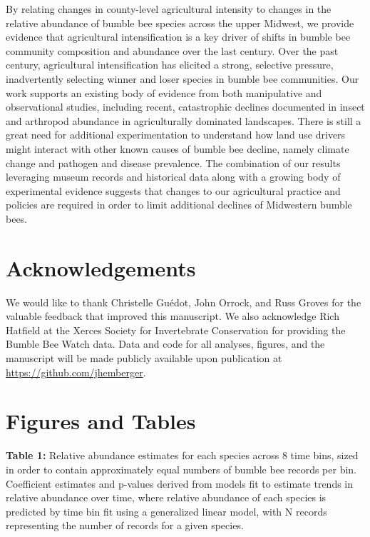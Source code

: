 \documentclass[11pt,]{article}
\begin{document}
By relating changes in county-level agricultural intensity to changes in
the relative abundance of bumble bee species across the upper Midwest,
we provide evidence that agricultural intensification is a key driver of
shifts in bumble bee community composition and abundance over the last
century. Over the past century, agricultural intensification has
elicited a strong, selective pressure, inadvertently selecting winner
and loser species in bumble bee communities. Our work supports an
existing body of evidence from both manipulative and observational
studies, including recent, catastrophic declines documented in insect
and arthropod abundance in agriculturally dominated landscapes. There is
still a great need for additional experimentation to understand how land
use drivers might interact with other known causes of bumble bee
decline, namely climate change and pathogen and disease prevalence. The
combination of our results leveraging museum records and historical data
along with a growing body of experimental evidence suggests that changes
to our agricultural practice and policies are required in order to limit
additional declines of Midwestern bumble bees.

\hypertarget{acknowledgements}{%
\section{Acknowledgements}\label{acknowledgements}}

We would like to thank Christelle Guédot, John Orrock, and Russ Groves
for the valuable feedback that improved this manuscript. We also
acknowledge Rich Hatfield at the Xerces Society for Invertebrate
Conservation for providing the Bumble Bee Watch data. Data and code for
all analyses, figures, and the manuscript will be made publicly
available upon publication at \url{https://github.com/jhemberger}.
\clearpage

\newpage

\hypertarget{figures-and-tables}{%
\section{Figures and Tables}\label{figures-and-tables}}

\textbf{Table 1:} Relative abundance estimates for each species across 8
time bins, sized in order to contain approximately equal numbers of
bumble bee records per bin. Coefficient estimates and p-values derived
from models fit to estimate trends in relative abundance over time,
where relative abundance of each species is predicted by time bin fit
using a generalized linear model, with N records representing the number
of records for a given species.
\end{document}
